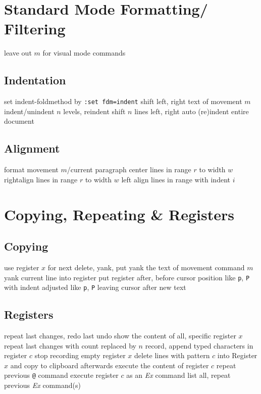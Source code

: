 \section{Standard Mode Formatting/ Filtering}	{leave out $m$ for visual mode commands}

\subsection{Indentation}{set indent-foldmethod by {\tt :set fdm=indent}}
	{shift left, right text of movement $m$}
	{indent/unindent $n$ levels, reindent}
	{shift $n$ lines left, right}
	{auto (re)indent entire document}

\subsection{Alignment}{}
	{format movement $m$/current paragraph}
	{center lines in range $r$ to width $w$}
	{rightalign lines in range $r$ to width $w$}
	{left align lines in range with indent $i$}

\section{Copying, Repeating \& Registers}	{}
\subsection{Copying}	{}
	{use register $x$ for next delete, yank, put}
	{yank the text of movement command $m$}
	{yank current line into register}
	{put register after, before cursor position}
	{like {\tt p}, {\tt P} with indent adjusted}
	{like {\tt p}, {\tt P} leaving cursor after new text}

\subsection{Registers}{}
	{repeat last changes, redo last undo}
	{show the content of all, specific register $x$}
	{repeat last changes with count replaced by $n$ }
	{record, append typed characters in register $c$}
	{stop recording}
	{empty register $x$}
	{delete lines with pattern $c$ into Register $x$ and copy to clipboard afterwards}
	{execute the content of register $c$}
	{repeat previous {\tt @} command}
	{execute register $c$ as an {\it Ex\/} command}
	{list all, repeat previous {\it Ex\/} command(s)}

